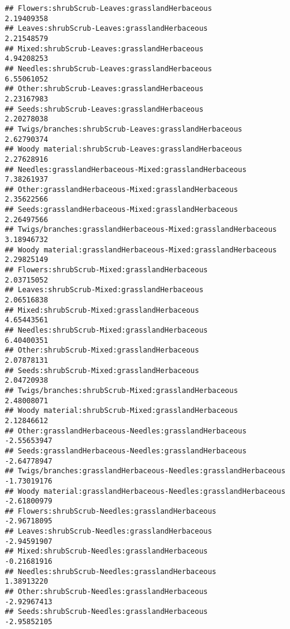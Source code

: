 \documentclass[
]{article}
\begin{document}
\begin{verbatim}
## Flowers:shrubScrub-Leaves:grasslandHerbaceous                          2.19409358
## Leaves:shrubScrub-Leaves:grasslandHerbaceous                           2.21548579
## Mixed:shrubScrub-Leaves:grasslandHerbaceous                            4.94208253
## Needles:shrubScrub-Leaves:grasslandHerbaceous                          6.55061052
## Other:shrubScrub-Leaves:grasslandHerbaceous                            2.23167983
## Seeds:shrubScrub-Leaves:grasslandHerbaceous                            2.20278038
## Twigs/branches:shrubScrub-Leaves:grasslandHerbaceous                   2.62790374
## Woody material:shrubScrub-Leaves:grasslandHerbaceous                   2.27628916
## Needles:grasslandHerbaceous-Mixed:grasslandHerbaceous                  7.38261937
## Other:grasslandHerbaceous-Mixed:grasslandHerbaceous                    2.35622566
## Seeds:grasslandHerbaceous-Mixed:grasslandHerbaceous                    2.26497566
## Twigs/branches:grasslandHerbaceous-Mixed:grasslandHerbaceous           3.18946732
## Woody material:grasslandHerbaceous-Mixed:grasslandHerbaceous           2.29825149
## Flowers:shrubScrub-Mixed:grasslandHerbaceous                           2.03715052
## Leaves:shrubScrub-Mixed:grasslandHerbaceous                            2.06516838
## Mixed:shrubScrub-Mixed:grasslandHerbaceous                             4.65443561
## Needles:shrubScrub-Mixed:grasslandHerbaceous                           6.40400351
## Other:shrubScrub-Mixed:grasslandHerbaceous                             2.07878131
## Seeds:shrubScrub-Mixed:grasslandHerbaceous                             2.04720938
## Twigs/branches:shrubScrub-Mixed:grasslandHerbaceous                    2.48008071
## Woody material:shrubScrub-Mixed:grasslandHerbaceous                    2.12846612
## Other:grasslandHerbaceous-Needles:grasslandHerbaceous                 -2.55653947
## Seeds:grasslandHerbaceous-Needles:grasslandHerbaceous                 -2.64778947
## Twigs/branches:grasslandHerbaceous-Needles:grasslandHerbaceous        -1.73019176
## Woody material:grasslandHerbaceous-Needles:grasslandHerbaceous        -2.61800979
## Flowers:shrubScrub-Needles:grasslandHerbaceous                        -2.96718095
## Leaves:shrubScrub-Needles:grasslandHerbaceous                         -2.94591907
## Mixed:shrubScrub-Needles:grasslandHerbaceous                          -0.21681916
## Needles:shrubScrub-Needles:grasslandHerbaceous                         1.38913220
## Other:shrubScrub-Needles:grasslandHerbaceous                          -2.92967413
## Seeds:shrubScrub-Needles:grasslandHerbaceous                          -2.95852105

\end{verbatim}
\end{document}
